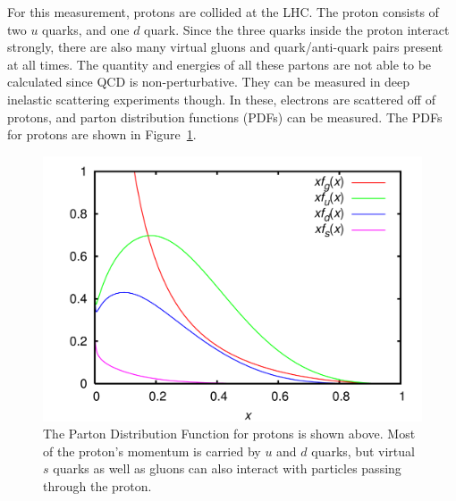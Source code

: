 For this measurement, protons are collided at the LHC.
The proton consists of two $u$ quarks, and one $d$ quark.
Since the three quarks inside the proton interact strongly,
there are also many virtual gluons and quark/anti-quark pairs present at all times.
The quantity and energies of all these partons are not able to be calculated
since QCD is non-perturbative.
They can be measured in deep inelastic scattering experiments though.
In these, electrons are scattered off of protons,
and parton distribution functions (PDFs) can be measured.
The PDFs for protons are shown in Figure~\ref{fig:pdf}.
\begin{figure}
  \centering
  \includegraphics[width=0.7\linewidth]{figures/CTEQ6_parton_distribution_functions.png}
  \caption[Parton Distribution Function for protons]{
    The Parton Distribution Function for protons is shown above.
    Most of the proton's momentum is carried by $u$ and $d$ quarks,
    but virtual $s$ quarks as well as gluons can also interact with particles passing through the proton.
  }
  \label{fig:pdf}
\end{figure}

